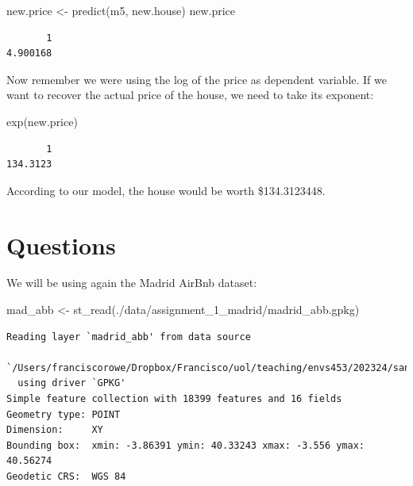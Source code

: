 \documentclass[
  letterpaper,
  DIV=11,
  numbers=noendperiod,
  oneside]{scrreprt}
\newenvironment{Shaded}{\begin{snugshade}}{\end{snugshade}}
\newcommand{\FunctionTok}[1]{\textcolor[rgb]{0.28,0.35,0.67}{#1}}
\newcommand{\NormalTok}[1]{\textcolor[rgb]{0.00,0.23,0.31}{#1}}
\newcommand{\OtherTok}[1]{\textcolor[rgb]{0.00,0.23,0.31}{#1}}
\newcommand{\StringTok}[1]{\textcolor[rgb]{0.13,0.47,0.30}{#1}}
\begin{document}
\begin{Shaded}
\begin{Highlighting}[]
\NormalTok{new.price }\OtherTok{\textless{}{-}} \FunctionTok{predict}\NormalTok{(m5, new.house)}
\NormalTok{new.price}
\end{Highlighting}
\end{Shaded}

\begin{verbatim}
       1 
4.900168 
\end{verbatim}

Now remember we were using the log of the price as dependent variable.
If we want to recover the actual price of the house, we need to take its
exponent:

\begin{Shaded}
\begin{Highlighting}[]
\FunctionTok{exp}\NormalTok{(new.price)}
\end{Highlighting}
\end{Shaded}

\begin{verbatim}
       1 
134.3123 
\end{verbatim}

According to our model, the house would be worth \$134.3123448.

\section{Questions}\label{questions-2}

We will be using again the Madrid AirBnb dataset:

\begin{Shaded}
\begin{Highlighting}[]
\NormalTok{mad\_abb }\OtherTok{\textless{}{-}} \FunctionTok{st\_read}\NormalTok{(}\StringTok{\textquotesingle{}./data/assignment\_1\_madrid/madrid\_abb.gpkg\textquotesingle{}}\NormalTok{)}
\end{Highlighting}
\end{Shaded}

\begin{verbatim}
Reading layer `madrid_abb' from data source 
  `/Users/franciscorowe/Dropbox/Francisco/uol/teaching/envs453/202324/san/data/assignment_1_madrid/madrid_abb.gpkg' 
  using driver `GPKG'
Simple feature collection with 18399 features and 16 fields
Geometry type: POINT
Dimension:     XY
Bounding box:  xmin: -3.86391 ymin: 40.33243 xmax: -3.556 ymax: 40.56274
Geodetic CRS:  WGS 84
\end{verbatim}
\end{document}
